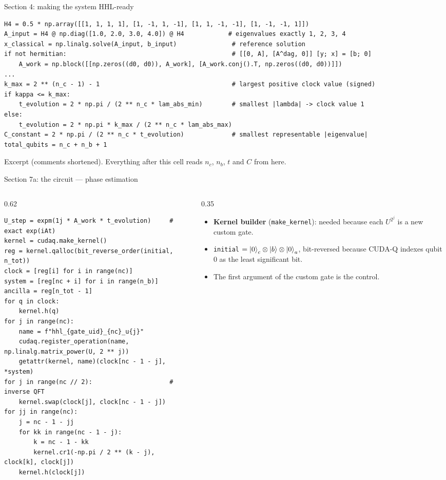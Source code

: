 \documentclass[aspectratio=169,11pt]{beamer}
\newcommand{\key}[1]{{\color{qdark}\textbf{#1}}}
\begin{document}
\begin{frame}[fragile]{Section 4: making the system HHL-ready}
\begin{lstlisting}[basicstyle=\ttfamily\tiny]
H4 = 0.5 * np.array([[1, 1, 1, 1], [1, -1, 1, -1], [1, 1, -1, -1], [1, -1, -1, 1]])
A_input = H4 @ np.diag([1.0, 2.0, 3.0, 4.0]) @ H4            # eigenvalues exactly 1, 2, 3, 4
x_classical = np.linalg.solve(A_input, b_input)               # reference solution
if not hermitian:                                             # [[0, A], [A^dag, 0]] [y; x] = [b; 0]
    A_work = np.block([[np.zeros((d0, d0)), A_work], [A_work.conj().T, np.zeros((d0, d0))]])
...
k_max = 2 ** (n_c - 1) - 1                                    # largest positive clock value (signed)
if kappa <= k_max:
    t_evolution = 2 * np.pi / (2 ** n_c * lam_abs_min)        # smallest |lambda| -> clock value 1
else:
    t_evolution = 2 * np.pi * k_max / (2 ** n_c * lam_abs_max)
C_constant = 2 * np.pi / (2 ** n_c * t_evolution)             # smallest representable |eigenvalue|
total_qubits = n_c + n_b + 1
\end{lstlisting}
  \small Excerpt (comments shortened). Everything after this cell reads $n_c$, $n_b$, $t$ and $C$ from here.
\end{frame}

\begin{frame}[fragile]{Section 7a: the circuit --- phase estimation}
  \begin{columns}[T]
    \begin{column}{0.62\textwidth}
\begin{lstlisting}[basicstyle=\ttfamily\tiny]
U_step = expm(1j * A_work * t_evolution)     # exact exp(iAt)
kernel = cudaq.make_kernel()
reg = kernel.qalloc(bit_reverse_order(initial, n_tot))
clock = [reg[i] for i in range(nc)]
system = [reg[nc + i] for i in range(n_b)]
ancilla = reg[n_tot - 1]
for q in clock:
    kernel.h(q)
for j in range(nc):
    name = f"hhl_{gate_uid}_{nc}_u{j}"
    cudaq.register_operation(name, np.linalg.matrix_power(U, 2 ** j))
    getattr(kernel, name)(clock[nc - 1 - j], *system)
for j in range(nc // 2):                     # inverse QFT
    kernel.swap(clock[j], clock[nc - 1 - j])
for jj in range(nc):
    j = nc - 1 - jj
    for kk in range(nc - 1 - j):
        k = nc - 1 - kk
        kernel.cr1(-np.pi / 2 ** (k - j), clock[k], clock[j])
    kernel.h(clock[j])
\end{lstlisting}
    \end{column}
    \begin{column}{0.35\textwidth}
      \small
      \begin{itemize}
        \item \key{Kernel builder} (\texttt{make\_kernel}): needed because each $U^{2^j}$ is a new custom gate.
        \item \texttt{initial} $= \ket{0}_c\otimes\ket b\otimes\ket0_a$, bit-reversed because CUDA-Q indexes qubit 0 as the least significant bit.
        \item The first argument of the custom gate is the control.
      \end{itemize}
    \end{column}
  \end{columns}
\end{frame}
\end{document}
